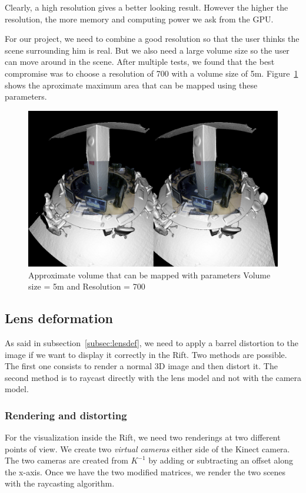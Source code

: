 \documentclass[12pt, twoside]{article}
\begin{document}
Clearly, a high resolution gives a better looking result. However the higher the resolution, the more memory and computing power we ask from the GPU.

For our project, we need to combine a good resolution so that the user thinks the scene surrounding him is real. But we also need a large volume size so the user can move around in the scene. After multiple tests, we found that the best compromise was to choose a resolution of 700 with a volume size of 5m. Figure~\ref{fig:totalvol} shows the aproximate maximum area that can be mapped using these parameters.

\begin{figure}[h]
  \centering
  \includegraphics[scale=0.3]{TotalVol.png}
  \caption{\label{fig:totalvol} Approximate volume that can be mapped with parameters Volume size = 5m and Resolution = 700}
\end{figure}

\subsection{Lens deformation}
\label{subsec:deformation}
As said in subsection~\ref{subsec:lensdef}, we need to apply a barrel distortion to the image if we want to display it correctly in the Rift. Two methods are possible. The first one consists to render a normal 3D image and then distort it. The second method is to raycast directly with the lens model and not with the camera model.

\subsubsection{Rendering and distorting}
For the visualization inside the Rift, we need two renderings at two different points of view. We create two \textit{virtual cameras} either side of the Kinect camera. The two cameras are created from $K^{-1}$ by adding or subtracting an offset along the x-axis. Once we have the two modified matrices, we render the two scenes with the raycasting algorithm.
\end{document}
